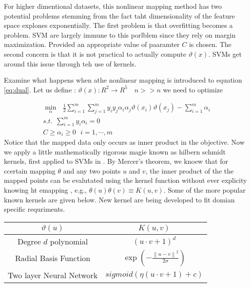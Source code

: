For higher dimentional datasets, this nonlinear mapping method has two potential problems stemming from the fact taht dimensionality of the feature space explones exponentially. The first problem is that overfitting becomes a problem. SVM are largely immune to this porlblem since they rely on margin maximization. Provided an appropriate value of paaramter $C$ is chosen. The second concern is that it is not practical to actually compute $\vartheta(x)$. SVMs get around this issue through teh use of kernels. 

Examine what happens when athe nonlinear mapping is introduced to equation \ref{eq:dual}. Let us define : $\vartheta(x):R^2\rightarrow R^5 \quad n>> n$  we need to optimize

\begin{equation}
\begin{array}{c}
\min_{\alpha} \ \ \   \frac{1}{2} \sum_{i=1}^{m}{\sum_{j=1}^{m}{y_iy_j\alpha_i\alpha_j\vartheta(x_i)\vartheta(x_j)}} - \sum_{i=1}^{m}{\alpha_i} \\
s.t. \ \ \sum_{i=1}^{m}{y_i\alpha_i}=0   \\
 C \geq \alpha_i \geq 0  \ \ \ i=1,\cdots , m 
 \end{array} 
\label{eq:dualkernel}
\end{equation}
Notice that the mapped data only occurs as inner product in the objective. Now we apply a little mathematically rigorous magie known as hilbern schmidt kernels, first applied to SVMs in \cite{svmintroduce}.  By Mercer's theorem, we knoew that for ccertain mapping $\theta$ and any two points $u$ and $v$, the inner product of the the mapped points can be evalutated using the kernel function without ever explicity knowing ht emapping , e.g., $\theta(u)\theta(v)\equiv K(u,v)$. Some of the more popular known kernels are given below. New kernel are being developed to fit domian specific requriments. 
\begin{center}
	\begin{tabular}{cc}
	$\vartheta(u)$  & $K(u,v)$ \\ \hline 
	Degree $d$ polynomial & $\left(u\cdot v +1\right)^d$ \\ 
	Radial Basis Function & $\exp \left( - \frac{\left\|u-v\right\|^2}{2\sigma}\right) $ \\ 
		Two layer Neural Network& $ sigmoid \left(\eta\left(u\cdot v +1\right)+c\right)$ \\ 
		
	\end{tabular}
\end{center}
